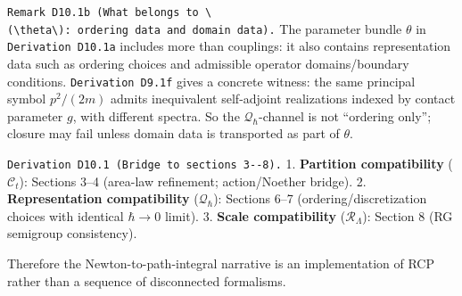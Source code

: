\documentclass[
]{article}
\begin{document}
\texttt{Remark\ D10.1b\ (What\ belongs\ to\ \textbackslash{}(\textbackslash{}theta\textbackslash{}):\ ordering\ data\ and\ domain\ data).}
The parameter bundle \(\theta\) in \texttt{Derivation\ D10.1a} includes
more than couplings: it also contains representation data such as
ordering choices and admissible operator domains/boundary conditions.
\texttt{Derivation\ D9.1f} gives a concrete witness: the same principal
symbol \(p^2/(2m)\) admits inequivalent self-adjoint realizations
indexed by contact parameter \(g\), with different spectra. So the
\(\mathcal Q_\hbar\)-channel is not ``ordering only''; closure may fail
unless domain data is transported as part of \(\theta\).

\texttt{Derivation\ D10.1\ (Bridge\ to\ sections\ 3-\/-8).} 1.
\textbf{Partition compatibility} (\(\mathcal C_t\)): Sections 3--4
(area-law refinement; action/Noether bridge). 2. \textbf{Representation
compatibility} (\(\mathcal Q_\hbar\)): Sections 6--7
(ordering/discretization choices with identical \(\hbar\to0\) limit). 3.
\textbf{Scale compatibility} (\(\mathcal R_\Lambda\)): Section 8 (RG
semigroup consistency).

Therefore the Newton-to-path-integral narrative is an implementation of
RCP rather than a sequence of disconnected formalisms.
\end{document}
